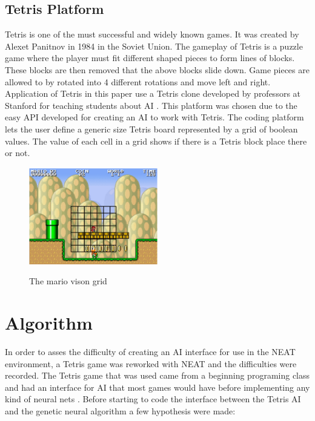 \documentclass[12pt]{ucthesis} \newif\ifpdf \ifx\pdfoutput\undefined
\begin{document}
\section{Tetris Platform}

Tetris is one of the must successful and widely known games. It was created by
Alexet Panitnov in 1984 in the Soviet Union. The gameplay of Tetris is a puzzle
game where the player must fit different shaped pieces to form lines of blocks.
These blocks are then removed that the above blocks slide down. Game pieces are
allowed to by rotated into 4 different rotations and move left and right.
Application of Tetris in this paper use a Tetris clone developed by professors
at Stanford for teaching students about AI \cite{tetris}. This
platform was chosen due to the easy API developed for creating an AI to work with Tetris. The coding platform
lets the user define a generic size Tetris board represented by a grid of boolean
values. The value of each cell in a grid shows if there is a Tetris block place
there or not.

\begin{figure}[h!] 
\caption{The mario vison grid}
  \centering
    \includegraphics[width=0.5\textwidth]{mariogrid.png}
   \label{fig:mariogrid} 
\end{figure}

\chapter{Algorithm}

In order to asses the difficulty of creating an AI interface for use in the NEAT
environment, a Tetris game was reworked with NEAT and the difficulties were
recorded. The Tetris game that was used came from a beginning programing class
and had an interface for AI that most games would have before implementing any
kind of neural nets \cite{tetris}. Before starting to code the interface between
the Tetris AI and the genetic neural algorithm a few hypothesis were made:
\end{document}

